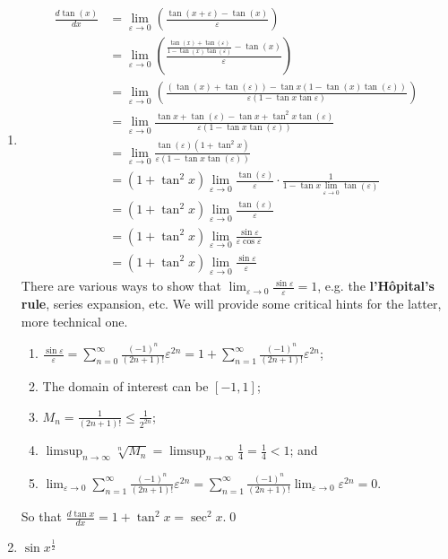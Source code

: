 \documentclass[10pt]{article}
\begin{document}
\begin{enumerate}[label=\alph*.]
\item $$\begin{aligned} \frac{d \tan (x)}{d x} &=\lim _{\varepsilon \rightarrow 0}\left(\frac{\tan (x+\varepsilon)-\tan (x)}{\varepsilon}\right) \\ &=\lim _{\varepsilon \rightarrow 0}\left(\frac{\frac{\tan (x)+\tan (\varepsilon)}{1-\tan (x) \tan (\varepsilon)}-\tan (x)}{\varepsilon}\right) \\ &=\lim _{\varepsilon \rightarrow 0}\left(\frac{(\tan (x)+\tan (\varepsilon))-\tan x(1-\tan (x) \tan (\varepsilon))}{\varepsilon(1-\tan x \tan \varepsilon)}\right) \\ &=\lim _{\varepsilon \rightarrow 0} \frac{\tan x+\tan (\varepsilon)-\tan x+\tan ^{2} x \tan (\varepsilon)}{\varepsilon(1-\tan x \tan (\varepsilon))} \\ &=\lim _{\varepsilon \rightarrow 0} \frac{\tan (\varepsilon)\left(1+\tan ^{2} x\right)}{\varepsilon(1-\tan x \tan (\varepsilon))} \\ &=\left(1+\tan ^{2} x\right) \lim _{\varepsilon \rightarrow 0} \frac{\tan (\varepsilon)}{\varepsilon} \cdot\frac{1}{\displaystyle1-\tan x \lim _{\varepsilon \rightarrow 0}\tan (\varepsilon)} \\ &=\left(1+\tan ^{2} x\right) \lim _{\varepsilon \rightarrow 0} \frac{\tan (\varepsilon)}{\varepsilon} \\ &=\left(1+\tan ^{2} x\right) \lim _{\varepsilon \rightarrow 0} \frac{\sin\varepsilon}{\varepsilon\cos\varepsilon} \\ &=\left(1+\tan ^{2} x\right) \lim _{\varepsilon \rightarrow 0} \frac{\sin\varepsilon}{\varepsilon} \end{aligned}$$
There are various ways to show that $\displaystyle\lim_{\varepsilon\to0}\frac{\sin\varepsilon}{\varepsilon}=1$, e.g. the \textbf{l'H\^opital's rule}, series expansion, etc. We will provide some critical hints for the latter, more technical one.
\begin{enumerate}[label=\arabic*.]
\item $\displaystyle\frac{\sin \varepsilon}{\varepsilon}=\sum_{n=0}^{\infty} \frac{(-1)^{n}}{(2 n+1) !} \varepsilon^{2 n}=1+\sum_{n=1}^{\infty} \frac{(-1)^{n}}{(2 n+1) !} \varepsilon^{2 n}$;
\item The domain of interest can be $[-1,1]$;
\item $\displaystyle M_n=\frac{1}{(2n+1)!}\leq\frac{1}{2^{2n}}$;
\item $\displaystyle\limsup_{n\to\infty}\sqrt[n]{M_n}=\limsup_{n\to\infty}\frac{1}{4}=\frac{1}{4}<1$; and
\item $\displaystyle\lim_{\varepsilon\to0}\sum_{n=1}^{\infty} \frac{(-1)^{n}}{(2 n+1) !} \varepsilon^{2 n}=\sum_{n=1}^{\infty} \frac{(-1)^{n}}{(2 n+1) !} \lim_{\varepsilon\to0}\varepsilon^{2 n}=0$.
\end{enumerate}
So that $\displaystyle\frac{d\tan x}{dx}=1+\tan^2x=\sec^2x$.\qed

\item $\sin x^{\frac{1}{2}}$
\end{enumerate}
\end{document}
